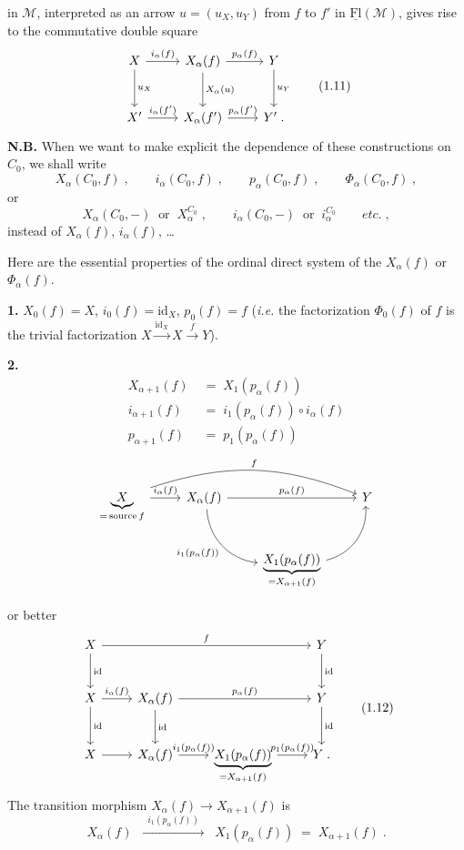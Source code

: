 \documentclass[11pt]{article}
\newcommand{\printedpage}[1]{\marginpar{\footnotesize p.~#1}}
\newcommand{\msp}[1]{\marginpar{\footnotesize [#1]}}
\newcommand{\M}{\mathcal{M}}
\newcommand{\uFl}{\underline{\mathrm{Fl}}}
\begin{document}
in $\M$, interpreted as an arrow $u = (u_X, u_Y)$ from $f$ to $f'$ in $\uFl(\M)$, gives rise to the commutative double square
\[
\begin{tikzcd}[row sep=large]
X \arrow[r, "i_\alpha(f)"] \arrow[d, "u_X"] & X_\alpha(f) \arrow[r, "p_\alpha(f)"] \arrow[d, "X_\alpha(u)"] & Y \arrow[d, "u_Y"] \\
X' \arrow[r, "{i_\alpha(f')}"] & X_\alpha(f') \arrow[r, "{p_\alpha(f')}"] & Y' \;.
\end{tikzcd}
\tag*{(1.11)}
\]
\textbf{N.B.} When we want to make explicit the dependence of these constructions on $C_0$, we shall write
\[
X_\alpha(C_0,f) \;, \qquad i_\alpha(C_0,f) \;, \qquad p_\alpha(C_0,f) \;, \qquad \Phi_\alpha(C_0,f) \;,
\]
or
\[
X_\alpha(C_0,-) \;\;\text{or}\;\; X_\alpha^{C_0} \;, \qquad i_\alpha(C_0,-) \;\;\text{or}\;\; i_\alpha^{C_0} \qquad \textit{etc.} \;,
\]
instead of $X_\alpha(f)$, $i_\alpha(f)$, \dots

Here are the essential properties of the ordinal direct system of the $X_\alpha(f)$ or $\Phi_\alpha(f)$.

\msp{page 3}

\textbf{1.} $X_0(f) = X$, $i_0(f) = \mathrm{id}_X$, $p_0(f) = f$ (\textit{i.e.} the factorization $\Phi_0(f)$ of $f$ is the trivial factorization $X \xrightarrow{\mathrm{id}_X} X \xrightarrow{f} Y$).

\textbf{2.}
\[
\begin{aligned}
X_{\alpha+1}(f) &\;=\; X_1(p_\alpha(f)) \\
i_{\alpha+1}(f) &\;=\; i_1(p_\alpha(f)) \circ i_\alpha(f) \\
p_{\alpha+1}(f) &\;=\; p_1(p_\alpha(f))
\end{aligned}
\]
\[
\begin{tikzcd}
\underbrace{X}_{= \,\mathrm{source}\, f} \arrow[r, "i_\alpha(f)"] \arrow[rrr, bend left=20, "f"] & X_\alpha(f) \arrow[rr, "p_\alpha(f)"] \arrow[dr, bend right=40, "i_1(p_\alpha(f))"'] & & Y \\
& & \underbrace{X_1(p_\alpha(f))}_{= X_{\alpha+1}(f)} \arrow[ur, bend right=40] &
\end{tikzcd}
\]

\clearpage

\printedpage{3}

or better
\[
\begin{tikzcd}[row sep=large]
X \arrow[rrr, "f"] \arrow[d, "\mathrm{id}"] & & & Y \arrow[d, "\mathrm{id}"] \\
X \arrow[r, "i_\alpha(f)"] \arrow[d, "\mathrm{id}"] & X_\alpha(f) \arrow[rr, "p_\alpha(f)"] \arrow[d, "\mathrm{id}"] & & Y \arrow[d, "\mathrm{id}"] \\
X \arrow[r] & X_\alpha(f) \arrow[r, "i_1(p_\alpha(f))"] & \underbrace{X_1(p_\alpha(f))}_{= X_{\alpha+1}(f)} \arrow[r, "p_1(p_\alpha(f))"] & Y \;.
\end{tikzcd}
\tag*{(1.12)}
\]
The transition morphism $X_\alpha(f) \longrightarrow X_{\alpha+1}(f)$ is
\[
X_\alpha(f) \;\; \xrightarrow{\;\;i_1(p_\alpha(f))\;\;} \;\; X_1(p_\alpha(f)) \;=\; X_{\alpha+1}(f) \;.
\]
\end{document}
